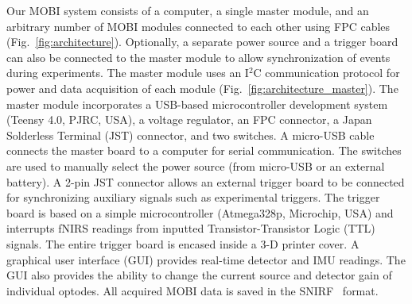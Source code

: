 Our \ac{MOBI} system consists of a computer, a single master module, and an arbitrary number of \ac{MOBI} modules connected to each other using FPC cables (Fig.~\ref{fig:architecture}). Optionally, a separate power source and a trigger board can also be connected to the master module to allow synchronization of events during experiments. The master module uses an I$^2$C communication protocol for power and data acquisition of each module (Fig.~\ref{fig:architecture_master}). The master module incorporates a USB-based microcontroller development system (Teensy 4.0, PJRC, USA), a voltage regulator, an FPC connector, a Japan Solderless Terminal (JST) connector, and two switches. A micro-USB cable connects the master board to a computer for serial communication. The switches are used to manually select the power source (from micro-USB or an external battery). A 2-pin JST connector allows an external trigger board to be connected for synchronizing auxiliary signals such as experimental triggers. The trigger board is based on a simple microcontroller (Atmega328p, Microchip, USA) and interrupts \ac{fNIRS} readings from inputted Transistor-Transistor Logic (TTL) signals. The entire trigger board is encased inside a 3-D printer cover. A graphical user interface (GUI) provides real-time detector and IMU readings. The GUI also provides the ability to change the current source and detector gain of individual optodes. All acquired \ac{MOBI} data is saved in the SNIRF~\cite{snirf2021} format. 

